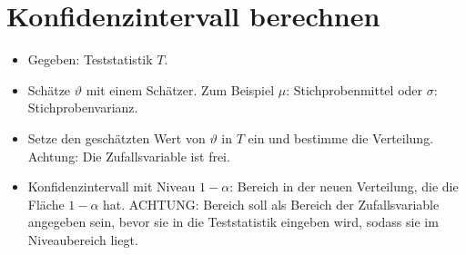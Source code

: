 \section{Konfidenzintervall berechnen}


\begin{itemize}
	\item Gegeben: Teststatistik $T$.
	\item Schätze $\vartheta$ mit einem Schätzer. Zum Beispiel $\mu$: Stichprobenmittel oder $\sigma$: Stichprobenvarianz.
	\item Setze den geschätzten Wert von $\vartheta$ in $T$ ein und bestimme die Verteilung. Achtung: Die Zufallsvariable ist frei. 
	\item Konfidenzintervall mit Niveau $1-\alpha$: Bereich in der neuen Verteilung, die die Fläche $1-\alpha$ hat. ACHTUNG: Bereich soll als Bereich der Zufallsvariable angegeben sein, bevor sie in die Teststatistik eingeben wird, sodass sie im Niveaubereich liegt.
\end{itemize}












































